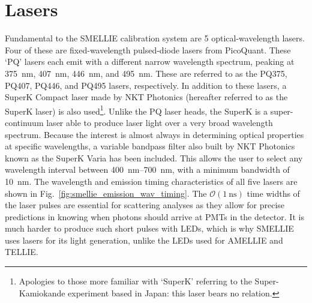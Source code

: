 \section{Lasers}\label{sec:smellie_lasers}
Fundamental to the SMELLIE calibration system are 5 optical-wavelength lasers. Four of these are fixed-wavelength pulsed-diode lasers from PicoQuant. These `PQ' lasers each emit with a different narrow wavelength spectrum, peaking at \SI{375}{\nm}, \SI{407}{\nm}, \SI{446}{\nm}, and \SI{495}{\nm}. These are referred to as the PQ375, PQ407, PQ446, and PQ495 lasers, respectively. In addition to these lasers, a SuperK Compact laser made by NKT Photonics (hereafter referred to as the SuperK laser) is also used\footnote{
    Apologies to those more familiar with `SuperK' referring to the Super-Kamiokande experiment based in Japan: this laser bears no relation.
}. Unlike the PQ laser heads, the SuperK is a super-continuum laser able to produce laser light over a very broad wavelength spectrum. Because the interest is almost always in determining optical properties at specific wavelengths, a variable bandpass filter also built by NKT Photonics known as the SuperK Varia has been included. This allows the user to select any wavelength interval between \SIrange{400}{700}{\nm}, with a minimum bandwidth of \SI{10}{\nm}. The wavelength and emission timing characteristics of all five lasers are shown in Fig.~\ref{fig:smellie_emission_wav_timing}. The $\mathcal{O}(\SI{1}{\ns})$ time widths of the laser pulses are essential for scattering analyses as they allow for precise predictions in knowing when photons should arrive at PMTs in the detector. It is much harder to produce such short pulses with LEDs, which is why SMELLIE uses lasers for its light generation, unlike the LEDs used for AMELLIE and TELLIE.

